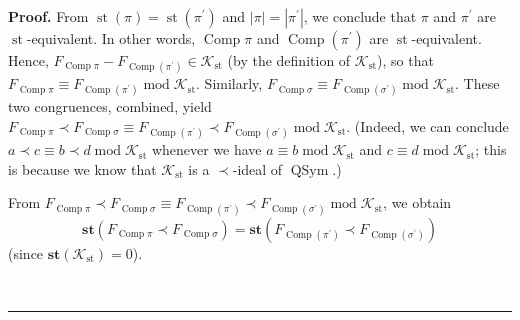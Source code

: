 \documentclass[numbers=enddot,12pt,final,onecolumn,notitlepage]{scrartcl}%
\theoremstyle{definition}
\newenvironment{proof}[1][Proof]{\noindent\textbf{#1.} }{\ \rule{0.5em}{0.5em}}
\begin{document}
\begin{proof}
From $\operatorname*{st}\left(  \pi\right)  =\operatorname*{st}\left(
\pi^{\prime}\right)  $ and $\left\vert \pi\right\vert =\left\vert \pi^{\prime
}\right\vert $, we conclude that $\pi$ and $\pi^{\prime}$ are
$\operatorname*{st}$-equivalent. In other words, $\operatorname*{Comp}\pi$ and
$\operatorname*{Comp}\left(  \pi^{\prime}\right)  $ are $\operatorname*{st}%
$-equivalent. Hence, $F_{\operatorname*{Comp}\pi}-F_{\operatorname*{Comp}%
\left(  \pi^{\prime}\right)  }\in\mathcal{K}_{\operatorname*{st}}$ (by the
definition of $\mathcal{K}_{\operatorname*{st}}$), so that
$F_{\operatorname*{Comp}\pi}\equiv F_{\operatorname*{Comp}\left(  \pi^{\prime
}\right)  }\operatorname{mod}\mathcal{K}_{\operatorname*{st}}$. Similarly,
$F_{\operatorname*{Comp}\sigma}\equiv F_{\operatorname*{Comp}\left(
\sigma^{\prime}\right)  }\operatorname{mod}\mathcal{K}_{\operatorname*{st}}$.
These two congruences, combined, yield $F_{\operatorname*{Comp}\pi}\left.
\prec\right.  F_{\operatorname*{Comp}\sigma}\equiv F_{\operatorname*{Comp}%
\left(  \pi^{\prime}\right)  }\left.  \prec\right.  F_{\operatorname*{Comp}%
\left(  \sigma^{\prime}\right)  }\operatorname{mod}\mathcal{K}%
_{\operatorname*{st}}$. (Indeed, we can conclude $a\left.  \prec\right.
c\equiv b\left.  \prec\right.  d\operatorname{mod}\mathcal{K}%
_{\operatorname*{st}}$ whenever we have $a\equiv b\operatorname{mod}%
\mathcal{K}_{\operatorname*{st}}$ and $c\equiv d\operatorname{mod}%
\mathcal{K}_{\operatorname*{st}}$; this is because we know that $\mathcal{K}%
_{\operatorname*{st}}$ is a $\left.  \prec\right.  $-ideal of
$\operatorname*{QSym}$.)

From $F_{\operatorname*{Comp}\pi}\left.  \prec\right.  F_{\operatorname*{Comp}%
\sigma}\equiv F_{\operatorname*{Comp}\left(  \pi^{\prime}\right)  }\left.
\prec\right.  F_{\operatorname*{Comp}\left(  \sigma^{\prime}\right)
}\operatorname{mod}\mathcal{K}_{\operatorname*{st}}$, we obtain%
\begin{equation}
\mathbf{st}\left(  F_{\operatorname*{Comp}\pi}\left.  \prec\right.
F_{\operatorname*{Comp}\sigma}\right)  =\mathbf{st}\left(
F_{\operatorname*{Comp}\left(  \pi^{\prime}\right)  }\left.  \prec\right.
F_{\operatorname*{Comp}\left(  \sigma^{\prime}\right)  }\right)
\label{pf.thm.dendri.K.ideal.steq}%
\end{equation}
(since $\mathbf{st}\left(  \mathcal{K}_{\operatorname*{st}}\right)  =0$).


\end{proof}
\end{document}
